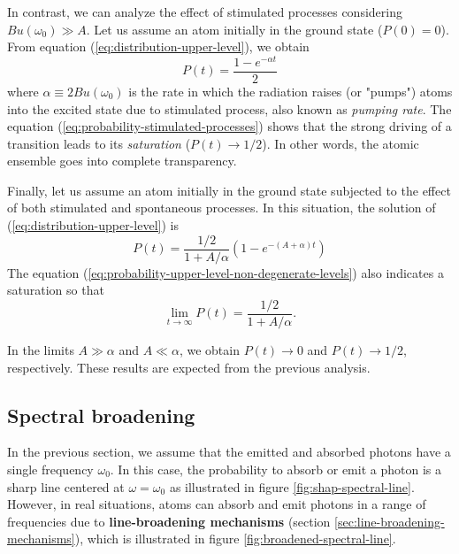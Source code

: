 In contrast, we can analyze the effect of stimulated processes considering $ B u(\omega_0) \gg A $. Let us assume an atom initially in the ground state ($ P(0) = 0 $). From equation (\ref{eq:distribution-upper-level}), we obtain
\begin{equation} 
	P(t) = \frac{1 - e^{-\alpha t}}{2}
	\label{eq:probability-stimulated-processes}
\end{equation}
where $ \alpha \equiv 2 B u(\omega_0) $ is the rate in which the radiation raises (or "pumps") atoms into the excited state due to stimulated process, also known as \textit{pumping rate}. The equation (\ref{eq:probability-stimulated-processes}) shows that the strong driving of a transition leads to its \textit{saturation} ($ P(t) \longrightarrow 1/2 $). In other words, the atomic ensemble goes into complete transparency.

Finally, let us assume an atom initially in the ground state subjected to the effect of both stimulated and spontaneous processes. In this situation, the solution of (\ref{eq:distribution-upper-level}) is
\begin{equation}
	P(t) = \frac{1/2}{1 + A / \alpha}(1 - e^{-(A + \alpha)t})
	\label{eq:probability-upper-level-non-degenerate-levels}
\end{equation}
The equation (\ref{eq:probability-upper-level-non-degenerate-levels}) also indicates a saturation so that
\begin{equation}
	\lim_{t \rightarrow \infty} P(t) = \frac{1/2}{1 + A / \alpha}.
\end{equation}

In the limits $ A \gg \alpha $ and $ A \ll \alpha $, we obtain $ P(t) \longrightarrow 0 $ and $ P(t) \longrightarrow 1/2 $, respectively. These results are expected from the previous analysis.

%
\subsection{Spectral broadening}
\label{sec:spectral-broadening}
%

In the previous section, we assume that the emitted and absorbed photons have a single frequency $ \omega_0 $. In this case, the probability to absorb or emit a photon is a sharp line centered at $ \omega = \omega_0 $ as illustrated in figure \ref{fig:shap-spectral-line}. However, in real situations, atoms can absorb and emit photons in a range of frequencies due to \textbf{line-broadening mechanisms} (section \ref{sec:line-broadening-mechanisms}), which is illustrated in figure \ref{fig:broadened-spectral-line}. 

